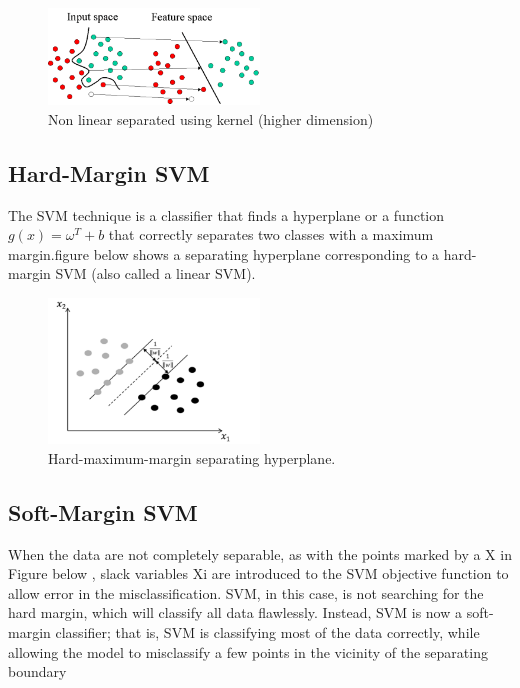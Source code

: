 \begin{figure}[H]
\centering
\includegraphics[width=0.5\textwidth]{img/SVMIntro3.png}
\caption{Non linear separated using kernel (higher dimension) }
\label{124 }
\end{figure}


\subsection{Hard-Margin SVM}
The SVM technique is a classifier that finds a hyperplane or a function $g(x) = {\omega}^T +  b$   that correctly separates two classes with a maximum margin.figure below shows a separating hyperplane corresponding to a hard-margin SVM (also called a linear SVM).

\begin{figure}[H]
\centering
\includegraphics[width=0.5\textwidth]{img/hardmargin.PNG}
\caption{ Hard-maximum-margin separating hyperplane. }
\label{125 }
\end{figure}


\subsection{Soft-Margin SVM}

When the data are not completely separable, as with the points marked by a X in Figure below  , slack variables Xi  are introduced to the SVM objective function to allow error in the misclassification. SVM, in this case, is not searching for the hard margin, which will classify all data flawlessly. Instead, SVM is now a soft-margin classifier; that is, SVM is classifying most of the data correctly, while allowing the model to misclassify a few points in the vicinity of the separating boundary

